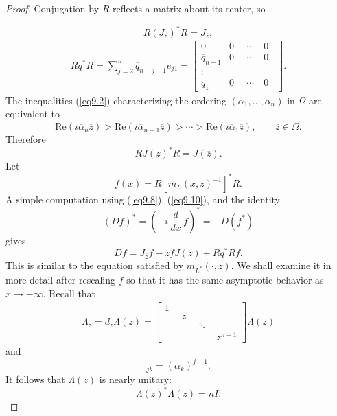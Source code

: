 \documentclass{surv-l}
\theoremstyle{plain}
\theoremstyle{definition}
\numberwithin{equation}{chapter}
\begin{document}
\begin{proof} Conjugation by $R$ reflects a matrix about its center, so

\begin{equation}\label{eq9.8}
R(J_{z})^{*}R = J_{\overline{z}},
\end{equation}
\begin{align}\label{eq9.9}
Rq^{*}R = \sum_{j=2}^{n}\overline{q}_{n-j+1}e_{j 1} = \left[\begin{array}{cccc}
0 & 0 & \cdots & 0\\
\overline{q}_{n-1} & 0 & \cdots & 0\\
\vdots & \quad & \quad & \quad\\
\overline{q}_{1} & 0 & \cdots & 0
\end{array}\right].
\end{align}
The inequalities (\ref{eq9.2}) characterizing the ordering $(\alpha_{1},\ldots,\alpha_{n})$ in $\Omega$ are equivalent to
\begin{equation*}
\mathrm{Re}(i\overline{\alpha}_{n}\overline{z}) > \mathrm{Re}(i\overline{\alpha}_{n-1}\overline{z}) >\cdots > \mathrm{Re}(i\overline{\alpha}_{1}\overline{z}),\qquad \overline{z}\in\overline{\Omega}.
\end{equation*}
Therefore
\begin{equation}\label{eq9.10}
RJ(z)^{*}R = J(\overline{z}).
\end{equation}
Let
\begin{equation*}
f(x)=R[m_{L}(x, z)^{-1}]^{*}R.
\end{equation*}
A simple computation using (\ref{eq9.8}), (\ref{eq9.10}), and the identity
\begin{equation*}
(Df)^{*} = \left(-i\,\frac{d}{dx}\,f\right)^{*} = -D(f^{*})
\end{equation*}
gives
\begin{equation}\label{eq9.11}
Df=J_{\overline{z}}f-\overline{z}fJ(\overline{z})+Rq^{*}Rf.
\end{equation}
This is similar to the equation satisfied by $m_{L^{*}}(\cdot, \overline{z})$. We shall examine it in more detail after rescaling $f$ so that it has the same asymptotic behavior as $ x\rightarrow-\infty$.
Recall that
\begin{align*}
\Lambda_{z}= d_{z}\Lambda(z)= \left[\begin{array}{cccc}
1 & \quad & \quad & \quad\\
\quad & z & \quad & \quad\\
\quad & \quad & \ddots & \quad\\
\quad & \quad & \quad & z^{n-1}\end{array}\right]\Lambda(z)
\end{align*}
and
\begin{equation*}
[\Lambda(z)]_{j k} = (\alpha_{k})^{j-1}.
\end{equation*}
It follows that $\Lambda(z)$ is nearly unitary:
\begin{equation}\label{eq9.12}
\Lambda(z)^{*}\Lambda(z)= nI.
\end{equation}


\end{proof}
\end{document}
